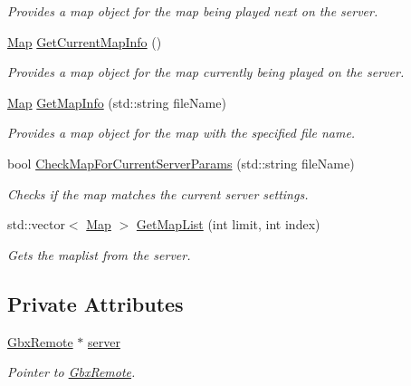 \begin{DoxyCompactItemize}
\begin{DoxyCompactList}\small\item\em Provides a map object for the map being played next on the server. \end{DoxyCompactList}\item 
\hyperlink{structMap}{Map} \hyperlink{classMethods_a4c8c8afabea84f839091c2a5a79b477d}{Get\-Current\-Map\-Info} ()
\begin{DoxyCompactList}\small\item\em Provides a map object for the map currently being played on the server. \end{DoxyCompactList}\item 
\hyperlink{structMap}{Map} \hyperlink{classMethods_a3a64508bc62765212bcf0d032b4f47ac}{Get\-Map\-Info} (std\-::string file\-Name)
\begin{DoxyCompactList}\small\item\em Provides a map object for the map with the specified file name. \end{DoxyCompactList}\item 
bool \hyperlink{classMethods_a93ac30a58c96f2635fef8f05b27a7864}{Check\-Map\-For\-Current\-Server\-Params} (std\-::string file\-Name)
\begin{DoxyCompactList}\small\item\em Checks if the map matches the current server settings. \end{DoxyCompactList}\item 
std\-::vector$<$ \hyperlink{structMap}{Map} $>$ \hyperlink{classMethods_ad30f67839b950d23c566535f43afefb4}{Get\-Map\-List} (int limit, int index)
\begin{DoxyCompactList}\small\item\em Gets the maplist from the server. \end{DoxyCompactList}\end{DoxyCompactItemize}
\subsection*{Private Attributes}
\begin{DoxyCompactItemize}
\item 
\hypertarget{classMethods_a3236d275d78d0836cb633de4b1ab5dd8}{\hyperlink{classGbxRemote}{Gbx\-Remote} $\ast$ \hyperlink{classMethods_a3236d275d78d0836cb633de4b1ab5dd8}{server}}\label{classMethods_a3236d275d78d0836cb633de4b1ab5dd8}

\begin{DoxyCompactList}\small\item\em Pointer to \hyperlink{classGbxRemote}{Gbx\-Remote}. \end{DoxyCompactList}\end{DoxyCompactItemize}


